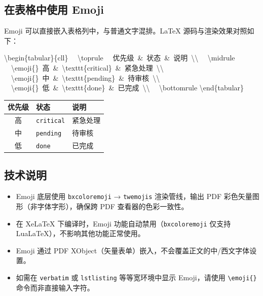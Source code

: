\documentclass[redline, titleindent, zhlineskip]{gbt9704}
\begin{document}
\subsection{在表格中使用 Emoji}

Emoji 可以直接嵌入表格列中，与普通文字混排。LaTeX 源码与渲染效果对照如下：

\begin{center}
\begin{minipage}[t]{0.52\textwidth}
\raggedright\small\ttfamily
\textbackslash begin\{tabular\}\{cll\}\newline
\ \ \textbackslash toprule\newline
\ \ 优先级\ \&\ 状态\ \&\ 说明\ \textbackslash\textbackslash\newline
\ \ \textbackslash midrule\newline
\ \ \textbackslash emoji\{\}\ 高\ \&\ \textbackslash texttt\{critical\}\ \&\ 紧急处理\ \textbackslash\textbackslash\newline
\ \ \textbackslash emoji\{\}\ 中\ \&\ \textbackslash texttt\{pending\}\ \&\ 待审核\ \textbackslash\textbackslash\newline
\ \ \textbackslash emoji\{\}\ 低\ \&\ \textbackslash texttt\{done\}\ \&\ 已完成\ \textbackslash\textbackslash\newline
\ \ \textbackslash bottomrule\newline
\textbackslash end\{tabular\}
\end{minipage}
\hfill
\begin{minipage}[t]{0.40\textwidth}
\centering
\begin{tabular}{cll}
\toprule
优先级 & 状态 & 说明 \\
\midrule
\emoji{🔴} 高 & \texttt{critical} & 紧急处理 \\
\emoji{🟡} 中 & \texttt{pending}  & 待审核 \\
\emoji{🟢} 低 & \texttt{done}     & 已完成 \\
\bottomrule
\end{tabular}
\end{minipage}
\end{center}

\subsection{技术说明}
\begin{itemize}
  \item Emoji 底层使用 \texttt{bxcoloremoji} → \texttt{twemojis} 渲染管线，输出 PDF 彩色矢量图形（非字体字形），确保跨 PDF 查看器的色彩一致性。
  \item 在 XeLaTeX 下编译时，Emoji 功能自动禁用（\texttt{bxcoloremoji} 仅支持 LuaLaTeX），不影响其他功能正常使用。
  \item Emoji 通过 PDF XObject（矢量表单）嵌入，不会覆盖正文的中/西文字体设置。
  \item 如需在 \texttt{verbatim} 或 \texttt{lstlisting} 等等宽环境中显示 Emoji，请使用 \verb|\emoji{}| 命令而非直接输入字符。
\end{itemize}
\end{document}
